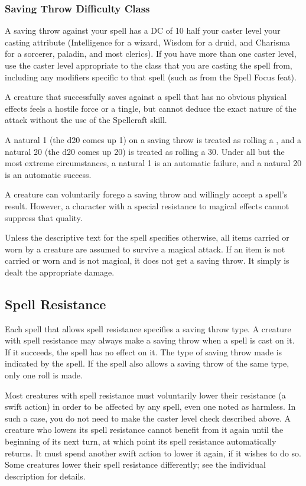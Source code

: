 \subsubsection{Saving Throw Difficulty Class}
A saving throw against your spell has a DC of 10 \add half your caster level \add your casting attribute (Intelligence for a wizard, Wisdom for a druid, and Charisma for a sorcerer, paladin, and most clerics). If you have more than one caster level, use the caster level appropriate to the class that you are casting the spell from, including any modifiers specific to that spell (such as from the Spell Focus feat).

 A creature that successfully saves against a spell that has no obvious physical effects feels a hostile force or a tingle, but cannot deduce the exact nature of the attack without the use of the Spellcraft skill.

 A natural 1 (the d20 comes up 1) on a saving throw is treated as rolling a , and a natural 20 (the d20 comes up 20) is treated as rolling a 30. Under all but the most extreme circumstances, a natural 1 is an automatic failure, and a natural 20 is an automatic success.

 A creature can voluntarily forego a saving throw and willingly accept a spell's result. However, a character with a special resistance to magical effects cannot suppress that quality.

 Unless the descriptive text for the spell specifies otherwise, all items carried or worn by a creature are assumed to survive a magical attack. If an item is not carried or worn and is not magical, it does not get a saving throw. It simply is dealt the appropriate damage.

\subsection{Spell Resistance}
Each spell that allows spell resistance specifies a saving throw type. A creature with spell resistance may always make a saving throw when a spell is cast on it. If it succeeds, the spell has no effect on it. The type of saving throw made is indicated by the spell. If the spell also allows a saving throw of the same type, only one roll is made.

Most creatures with spell resistance must voluntarily lower their resistance (a swift action) in order to be affected by any spell, even one noted as harmless. In such a case, you do not need to make the caster level check described above. A creature who lowers its spell resistance cannot benefit from it again until the beginning of its next turn, at which point its spell resistance automatically returns. It must spend another swift action to lower it again, if it wishes to do so. Some creatures lower their spell resistance differently; see the individual description for details.


